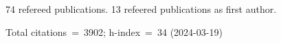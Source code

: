 74 refereed publications. 13 refeered publications as first author.

Total citations~=~3902; h-index~=~34 (2024-03-19)